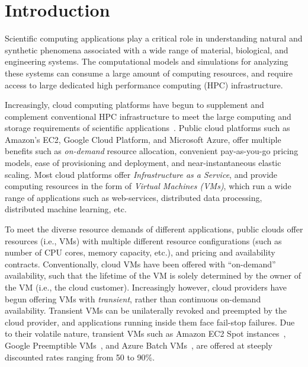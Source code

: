 \section{Introduction}


Scientific computing applications play a critical role in understanding natural and synthetic phenomena associated with a wide range of material, biological, and engineering systems. 
The computational models and simulations for analyzing these systems can consume a large amount of computing resources, and require access to large dedicated high performance computing (HPC) infrastructure. 







Increasingly, cloud computing platforms have begun to supplement and complement conventional HPC infrastructure  to meet the large computing and storage requirements of scientific applications~\cite{buyya-hpc-survey}. 
Public cloud platforms such as Amazon's EC2, Google Cloud Platform, and Microsoft Azure, offer multiple benefits such as \emph{on-demand} resource allocation, convenient pay-as-you-go pricing models, ease of provisioning and deployment, and near-instantaneous elastic scaling. 
Most cloud platforms offer \emph{Infrastructure as a Service}, and provide computing resources in the form of \emph{Virtual Machines (VMs)},  which run a wide range of applications such as web-services, distributed data processing, distributed machine learning, etc.



To meet the diverse resource demands of different applications, public clouds offer resources (i.e., VMs) with multiple different resource configurations (such as number of CPU cores,  memory capacity, etc.), and pricing and availability contracts. 
Conventionally, cloud VMs have been offered with ``on-demand'' availability, such that the lifetime of the VM is solely determined by the owner of the VM (i.e., the cloud customer). 
Increasingly however, cloud providers have begun offering VMs with \emph{transient}, rather than continuous on-demand availability. 
Transient VMs can be unilaterally revoked and preempted by the cloud provider, and applications running inside them face fail-stop failures. 
Due to their volatile nature, transient VMs such as Amazon EC2 Spot instances~\cite{spot}, Google Preemptible VMs~\cite{gcp-preempt}, and Azure Batch VMs~\cite{azure-batch}, are offered at steeply discounted rates ranging from 50 to 90\%.


